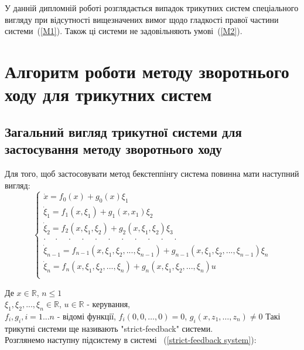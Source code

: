 \documentclass{article}
\begin{document}
У данній дипломній роботі розглядається випадок трикутних систем спеціального вигляду при відсутності вищезначених вимог
щодо гладкості правої  частини системи~(\ref{M1}). Також ці системи не задовільняють умові~(\ref{M2}).
\pagebreak




\section{Алгоритм роботи методу зворотнього ходу для трикутних систем}
\subsection{Загальний вигляд трикутної системи для застосування методу зворотнього ходу}
Для того, щоб застосовувати метод бекстеппінгу система повинна мати наступний вигляд:
\begin{equation} \label{strict-feedback system}
    \begin{cases}
        \dot x           = f_0(x)+g_0(x)\xi_1\\
        \dot \xi_1       = f_1(x, \xi_1)+g_{1}(x, x_1)\xi_2 \\
        \dot \xi_2       = f_2(x, \xi_1, \xi_2) + g_2(x, \xi_1, \xi_2)\xi_3 \\
       \cdot \quad \cdot \quad \cdot \quad \cdot  \quad \cdot  \quad \cdot
        \quad \cdot  \quad \cdot  \quad \cdot  \quad \cdot  \quad \cdot\\

       \dot \xi_{n-1}   = f_{n-1}(x, \xi_1, \xi_2, ... ,\xi_{n-1}) 
        +g_{n-1}(x, \xi_1, \xi_2, ... ,\xi_{n-1}) \xi_n\\
        \dot \xi_{n}     = f_{n}(x, \xi_1, \xi_2, ... ,\xi_{n}) 
        +g_{n}(x, \xi_1, \xi_2, ... ,\xi_{n})u\\

	\end{cases}
\end{equation}


Де $x \in \mathbb{R}$, $n \leq 1$\\
$\xi_1, \xi_2, ... ,\xi_n \in \mathbb{R}$, $u \in \mathbb{R}$ - керування,\\ 
$f_i, g_i, i = 1 ... n $ -  відомі функції, $f_i(0,0, \dots, 0) = 0$, 
$g_i(x,z_1, \dots, z_n) \neq 0$
Такі трикутні системи ще називають "strict-feedback" системи.\\
Розглянемо наступну підсистему в системі ~(\ref{strict-feedback system}):
\end{document}
